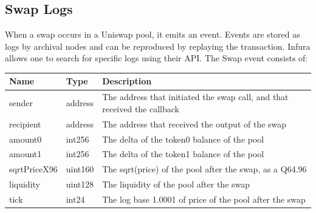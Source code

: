 \subsection{Swap Logs}
When a swap occurs in a Uniswap pool, it emits an event. Events are stored as logs by archival nodes and can be reproduced by replaying the transaction. Infura allows one to search for specific logs using their API. The Swap event consists of: \cite{swapdocs}
\begin{table}[h]
\begin{tabular}{|l|l|l|}
\hline
{\color[HTML]{1C1E21} Name}         & {\color[HTML]{1C1E21} Type}    & {\color[HTML]{1C1E21} Description}                                                              \\ \hline
{\color[HTML]{1C1E21} sender}       & {\color[HTML]{1C1E21} address} & {\color[HTML]{1C1E21} The address that initiated the swap call, and that received the callback} \\ \hline
{\color[HTML]{1C1E21} recipient}    & {\color[HTML]{1C1E21} address} & {\color[HTML]{1C1E21} The address that received the output of the swap}                         \\ \hline
{\color[HTML]{1C1E21} amount0}      & {\color[HTML]{1C1E21} int256}  & {\color[HTML]{1C1E21} The delta of the token0 balance of the pool}                              \\ \hline
{\color[HTML]{1C1E21} amount1}      & {\color[HTML]{1C1E21} int256}  & {\color[HTML]{1C1E21} The delta of the token1 balance of the pool}                              \\ \hline
{\color[HTML]{1C1E21} sqrtPriceX96} & {\color[HTML]{1C1E21} uint160} & {\color[HTML]{1C1E21} The sqrt(price) of the pool after the swap, as a Q64.96}                  \\ \hline
{\color[HTML]{1C1E21} liquidity}    & {\color[HTML]{1C1E21} uint128} & {\color[HTML]{1C1E21} The liquidity of the pool after the swap}                                 \\ \hline
{\color[HTML]{1C1E21} tick}         & {\color[HTML]{1C1E21} int24}   & {\color[HTML]{1C1E21} The log base 1.0001 of price of the pool after the swap}                  \\ \hline
\end{tabular}
\end{table}

